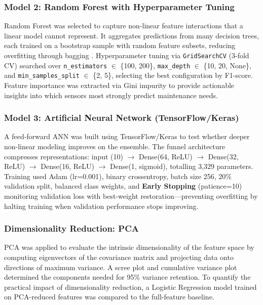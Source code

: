 \documentclass[11pt]{article}
\begin{document}
\subsubsection{Model 2: Random Forest with Hyperparameter Tuning}

Random Forest was selected to capture non-linear feature interactions that a linear model cannot represent. It aggregates predictions from many decision trees, each trained on a bootstrap sample with random feature subsets, reducing overfitting through bagging \cite{breiman2001random}. Hyperparameter tuning via \texttt{GridSearchCV} (3-fold CV) searched over \texttt{n\_estimators} $\in$ \{100, 200\}, \texttt{max\_depth} $\in$ \{10, 20, None\}, and \texttt{min\_samples\_split} $\in$ \{2, 5\}, selecting the best configuration by F1-score. Feature importance was extracted via Gini impurity to provide actionable insights into which sensors most strongly predict maintenance needs.

\subsubsection{Model 3: Artificial Neural Network (TensorFlow/Keras)}

A feed-forward ANN was built using TensorFlow/Keras \cite{tensorflow} to test whether deeper non-linear modeling improves on the ensemble. The funnel architecture compresses representations: input (10) $\rightarrow$ Dense(64, ReLU) $\rightarrow$ Dense(32, ReLU) $\rightarrow$ Dense(16, ReLU) $\rightarrow$ Dense(1, sigmoid), totalling 3,329 parameters. Training used Adam (lr=0.001), binary crossentropy, batch size 256, 20\% validation split, balanced class weights, and \textbf{Early Stopping} (patience=10) monitoring validation loss with best-weight restoration---preventing overfitting by halting training when validation performance stops improving.

\subsubsection{Dimensionality Reduction: PCA}

PCA was applied to evaluate the intrinsic dimensionality of the feature space by computing eigenvectors of the covariance matrix and projecting data onto directions of maximum variance. A scree plot and cumulative variance plot determined the components needed for 95\% variance retention. To quantify the practical impact of dimensionality reduction, a Logistic Regression model trained on PCA-reduced features was compared to the full-feature baseline.
\end{document}

